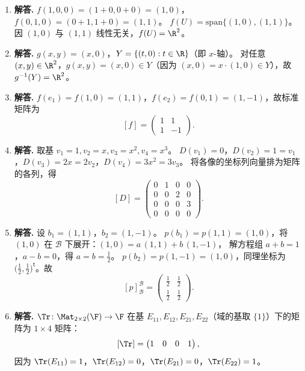 \begin{enumerate}[label=\textbf{\arabic*.}, leftmargin=*, itemsep=1em]
\item \textbf{解答.}
$f(1,0,0)=(1+0,0+0)=(1,0)$，$f(0,1,0)=(0+1,1+0)=(1,1)$。
$f(U)=\mathrm{span}\{(1,0),(1,1)\}$。
因 $(1,0)$ 与 $(1,1)$ 线性无关，$f(U)=\R^2$。

\item \textbf{解答.}
$g(x,y)=(x,0)$，$Y=\{(t,0):t\in\R\}$（即 $x$-轴）。
对任意 $(x,y)\in\R^2$，$g(x,y)=(x,0)\in Y$（因为 $(x,0)=x\cdot(1,0)\in Y$），故 $g^{-1}(Y)=\R^2$。

\item \textbf{解答.}
$f(e_1)=f(1,0)=(1,1)$，$f(e_2)=f(0,1)=(1,-1)$，故标准矩阵为
\[
  [f]=\begin{pmatrix}1 & 1\\ 1 & -1\end{pmatrix}.
\]

\item \textbf{解答.}
取基 $v_1=1,v_2=x,v_3=x^2,v_4=x^3$。
$D(v_1)=0$，$D(v_2)=1=v_1$，$D(v_3)=2x=2v_2$，$D(v_4)=3x^2=3v_3$。
将各像的坐标列向量排为矩阵的各列，得
\[
  [D]=\begin{pmatrix}0&1&0&0\\0&0&2&0\\0&0&0&3\\0&0&0&0\end{pmatrix}.
\]

\item \textbf{解答.}
设 $b_1=(1,1)$，$b_2=(1,-1)$。
$p(b_1)=p(1,1)=(1,0)$，将 $(1,0)$ 在 $\mathcal{B}$ 下展开：$(1,0)=a\,(1,1)+b\,(1,-1)$，
解方程组 $a+b=1$，$a-b=0$，得 $a=b=\tfrac{1}{2}$。
$p(b_2)=p(1,-1)=(1,0)$，同理坐标为 $\bigl(\tfrac{1}{2},\tfrac{1}{2}\bigr)^\mathsf{t}$。故
\[
  [p]_{\mathcal{B}}^{\mathcal{B}}=\begin{pmatrix}\tfrac{1}{2}&\tfrac{1}{2}\\[4pt]\tfrac{1}{2}&\tfrac{1}{2}\end{pmatrix}.
\]

\item \textbf{解答.}
$\Tr\colon\Mat_{2\times 2}(\F)\to\F$ 在基 $E_{11},E_{12},E_{21},E_{22}$（域的基取 $\{1\}$）下的矩阵为 $1\times 4$ 矩阵：
\[
  [\Tr]=\begin{pmatrix}1&0&0&1\end{pmatrix},
\]
因为 $\Tr(E_{11})=1$，$\Tr(E_{12})=0$，$\Tr(E_{21})=0$，$\Tr(E_{22})=1$。


\end{enumerate}
